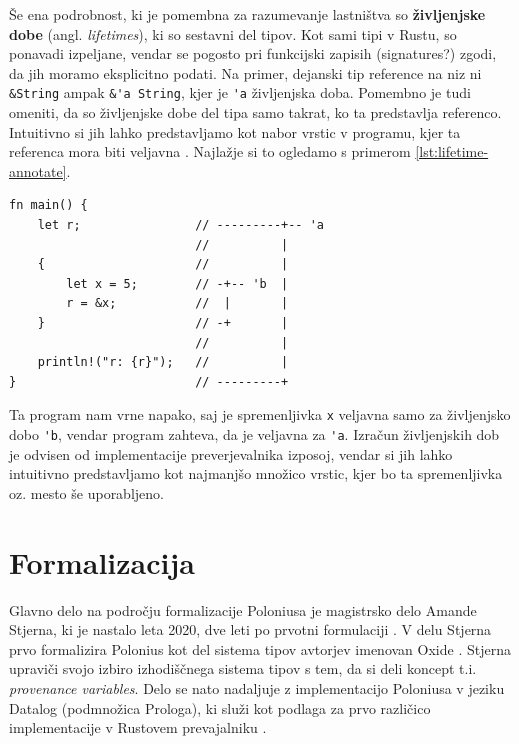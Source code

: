 \documentclass[a4paper,12pt,openright]{book}
\newcommand{\angl}[1]{(angl. \textit{#1})}
\begin{document}
Še ena podrobnost, ki je pomembna za razumevanje lastništva so \textbf{življenjske dobe} \angl{lifetimes}, ki so sestavni del tipov. Kot sami tipi v Rustu, so ponavadi izpeljane, vendar se pogosto pri funkcijski zapisih (signatures?) zgodi, da jih moramo eksplicitno podati. Na primer, dejanski tip reference na niz ni \verb|&String| ampak \verb|&'a String|, kjer je \verb|'a| življenjska doba. Pomembno je tudi omeniti, da so življenjske dobe del tipa samo takrat, ko ta predstavlja referenco. Intuitivno si jih lahko predstavljamo kot nabor vrstic v programu, kjer ta referenca mora biti veljavna \cite{klabnikRustProgrammingLanguage2023}. Najlažje si to ogledamo s primerom \ref{lst:lifetime-annotate}.

\begin{listing}[!ht]
	\begin{verbatim}
fn main() {
    let r;                // ---------+-- 'a
                          //          |
    {                     //          |
        let x = 5;        // -+-- 'b  |
        r = &x;           //  |       |
    }                     // -+       |
                          //          |
    println!("r: {r}");   //          |
}                         // ---------+ 
    \end{verbatim}
	\caption{Anotirane življenjske dobe na primeru}
	\label{lst:lifetime-annotate}
\end{listing}

Ta program nam vrne napako, saj je spremenljivka \verb|x| veljavna samo za življenjsko dobo \verb|'b|, vendar program zahteva, da je veljavna za \verb|'a|. Izračun življenjskih dob je odvisen od implementacije preverjevalnika izposoj, vendar si jih lahko intuitivno predstavljamo kot najmanjšo množico vrstic, kjer bo ta spremenljivka oz. mesto še uporabljeno.


\chapter{Formalizacija}

Glavno delo na področju formalizacije Poloniusa je magistrsko delo Amande Stjerna, ki je nastalo leta 2020, dve leti po prvotni formulaciji \cite{stjernaModellingRustsReference,AliasbasedFormulationBorrow}. V delu Stjerna prvo formalizira Polonius kot del sistema tipov avtorjev \citeauthor{weissOxideEssenceRust2019} imenovan Oxide \cite{weissOxideEssenceRust2019}. Stjerna upraviči svojo izbiro izhodiščnega sistema tipov s tem, da si deli koncept t.i. \textit{provenance variables}. Delo se nato nadaljuje z implementacijo Poloniusa v jeziku Datalog (podmnožica Prologa), ki služi kot podlaga za prvo različico implementacije v Rustovem prevajalniku \cite{RustlangPolonius2025}.
\end{document}
